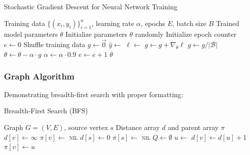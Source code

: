 \begin{algorithm}[htbp]
    \caption{Stochastic Gradient Descent for Neural Network Training}
    \label{alg:sgd}
    \begin{algorithmic}[1]
        \Require Training data $\{(x_i, y_i)\}_{i=1}^n$, learning rate $\alpha$, epochs $E$, batch size $B$
        \Ensure Trained model parameters $\theta$
        \State Initialize parameters $\theta$ randomly
        \State Initialize epoch counter $e \gets 0$
        \State Shuffle training data
        \State $g \gets \vec{0}$ 
        \State $\hat{y} \gets$  
        \State $\ell \gets$ 
        \State $g \gets g + \nabla_\theta \ell$ 
        \EndFor
        \State $g \gets g / |\mathcal{B}|$ 
        \State $\theta \gets \theta - \alpha \cdot g$ 
        \State $\alpha \gets \alpha \cdot 0.9$ 
        \EndIf
        \EndFor
        \State $e \gets e + 1$
        \EndWhile
        \State \Return $\theta$
    \end{algorithmic}
\end{algorithm}

\subsubsection{Graph Algorithm}

Demonstrating breadth-first search with proper formatting:

\begin{algorithm}[htbp]
    \caption{Breadth-First Search (BFS)}
    \label{alg:bfs}
    \begin{algorithmic}[1]
        \Require Graph $G = (V, E)$, source vertex $s$
        \Ensure Distance array $d$ and parent array $\pi$
        \State $d[v] \gets \infty$
        \State $\pi[v] \gets$ \textsc{nil}
        \EndFor
        \State $d[s] \gets 0$
        \State $\pi[s] \gets$ \textsc{nil}
        \State $Q \gets \emptyset$ 
        \State {}
        \State $u \gets$ 
        \State $d[v] \gets d[u] + 1$
        \State $\pi[v] \gets u$
        \State {}
        \EndIf
        \EndFor
        \EndWhile
    \end{algorithmic}
\end{algorithm}

